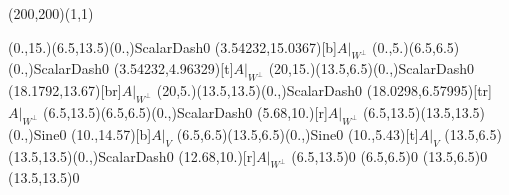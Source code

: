 \unitlength=1bp%

\begin{feynartspicture}(200,200)(1,1)

\FADiagram{}
\FAProp(0.,15.)(6.5,13.5)(0.,){ScalarDash}{0}
\FALabel(3.54232,15.0367)[b]{$A|_{W^\perp}$}
\FAProp(0.,5.)(6.5,6.5)(0.,){ScalarDash}{0}
\FALabel(3.54232,4.96329)[t]{$A|_{W^\perp}$}
\FAProp(20,15.)(13.5,6.5)(0.,){ScalarDash}{0}
\FALabel(18.1792,13.67)[br]{$A|_{W^\perp}$}
\FAProp(20,5.)(13.5,13.5)(0.,){ScalarDash}{0}
\FALabel(18.0298,6.57995)[tr]{$A|_{W^\perp}$}
\FAProp(6.5,13.5)(6.5,6.5)(0.,){ScalarDash}{0}
\FALabel(5.68,10.)[r]{$A|_{W^\perp}$}
\FAProp(6.5,13.5)(13.5,13.5)(0.,){Sine}{0}
\FALabel(10.,14.57)[b]{$A|_V$}
\FAProp(6.5,6.5)(13.5,6.5)(0.,){Sine}{0}
\FALabel(10.,5.43)[t]{$A|_V$}
\FAProp(13.5,6.5)(13.5,13.5)(0.,){ScalarDash}{0}
\FALabel(12.68,10.)[r]{$A|_{W^\perp}$}
\FAVert(6.5,13.5){0}
\FAVert(6.5,6.5){0}
\FAVert(13.5,6.5){0}
\FAVert(13.5,13.5){0}
\end{feynartspicture}

